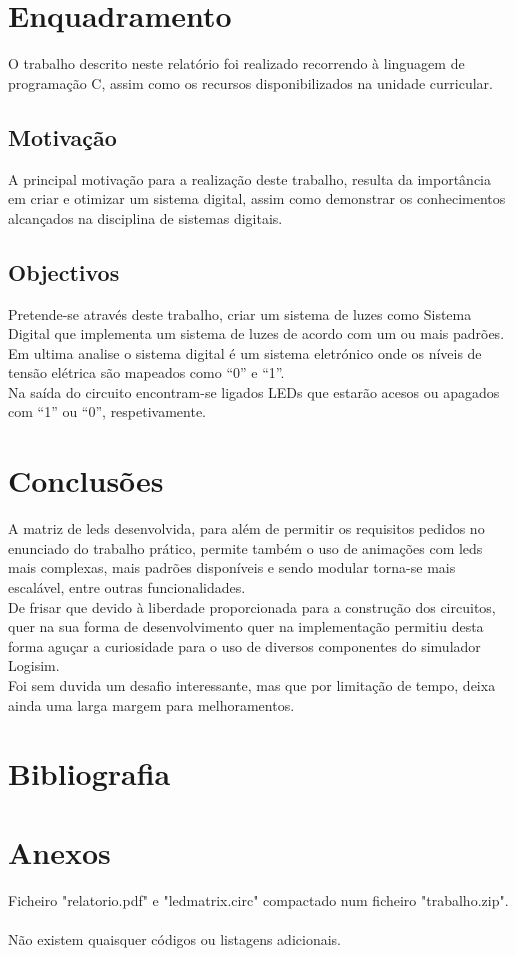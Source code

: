\documentclass[12pt,a4paper,portrait]{article}
\begin{document}
	\section{Enquadramento}
	O trabalho descrito neste relatório foi realizado recorrendo à linguagem de programação C, assim como os recursos disponibilizados na unidade curricular.\\
		\subsection{Motivação}
			A principal motivação para a realização deste trabalho, resulta da importância em criar e otimizar um sistema digital, assim como demonstrar os conhecimentos alcançados na disciplina de sistemas digitais.\\
		\subsection{Objectivos}
			Pretende-se através deste trabalho, criar um sistema de luzes como \cite{Csoares}Sistema Digital que implementa um sistema de luzes de acordo com um ou mais padrões.\\		
			Em ultima analise o sistema digital é um sistema eletrónico onde os níveis de tensão elétrica são  mapeados como “0” e “1”.\\
			Na saída do circuito encontram-se ligados LEDs que estarão acesos ou apagados com “1” ou “0”, respetivamente.\\
	\section{Conclusões}
		A matriz de leds desenvolvida, para além de permitir os requisitos pedidos no enunciado do trabalho prático, permite também o uso de animações com leds mais complexas, mais padrões disponíveis e sendo modular torna-se mais escalável, entre outras funcionalidades.\\
		De frisar que devido à liberdade proporcionada para a construção dos circuitos, quer na sua forma de desenvolvimento quer na implementação permitiu desta forma aguçar a curiosidade para o uso de diversos componentes do simulador Logisim.\\
		Foi sem duvida um desafio interessante, mas que por limitação de tempo, deixa ainda uma larga margem para melhoramentos.\\
	\newpage
	\section{Bibliografia}
	
	

	\newpage
	\section{Anexos}
		Ficheiro "relatorio.pdf" e "ledmatrix.circ" compactado num ficheiro "trabalho.zip".\\\\
		Não existem quaisquer códigos ou listagens adicionais.\\					
\end{document}
